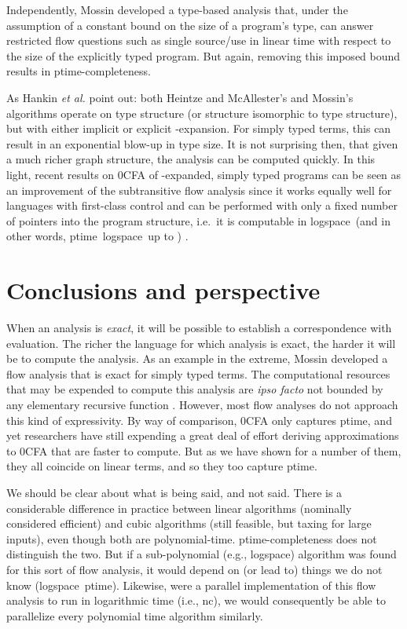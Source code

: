 \documentclass{llncs}
\newcommand\nc{{\sc nc}}
\newcommand\ptime{{\sc ptime}}
\newcommand\logspace{{\sc logspace}}
\begin{document}
Independently, Mossin \cite{mossin-98} developed a type-based analysis
that, under the assumption of a constant bound on the size of a
program's type, can answer restricted flow questions such as single
source/use in linear time with respect to the size of the explicitly
typed program.  But again, removing this imposed bound results in
\ptime-completeness.

As Hankin {\em et al.} \cite{hankin-games} point out: both Heintze
and McAllester's and Mossin's algorithms operate on type structure (or
structure isomorphic to type structure), but with either implicit or
explicit -expansion.  For simply typed terms, this can result in
an exponential blow-up in type size.  It is not surprising then, that
given a much richer graph structure, the analysis can be computed
quickly.  In this light, recent results on 0CFA of -expanded,
simply typed programs can be seen as an improvement of the
subtransitive flow analysis since it works equally well for languages
with first-class control and can be performed with only a fixed number
of pointers into the program structure, i.e.~it is computable in
\logspace\ (and in other words, \ptime\ 
\logspace\ up to ) \cite{vanhorn-mairson-07}.






\section{Conclusions and perspective}



When an analysis is {\em exact}, it will be possible to establish a
correspondence with evaluation.  The richer the language for which
analysis is exact, the harder it will be to compute the analysis.  As
an example in the extreme, Mossin \cite{mossin-97} developed a flow
analysis that is exact for simply typed terms.  The computational
resources that may be expended to compute this analysis are {\em ipso
facto} not bounded by any elementary recursive function
\cite{statman}.  However, most flow analyses do not approach this kind
of expressivity.  By way of comparison, 0CFA only captures \ptime, and
yet researchers have still expending a great deal of effort deriving
approximations to 0CFA that are faster to compute.  But as we have
shown for a number of them, they all coincide on linear terms, and so
they too capture \ptime.





We should be clear about what is being said, and not said.  There is a
considerable difference in practice between linear algorithms
(nominally considered efficient) and cubic algorithms (still feasible,
but taxing for large inputs), even though both are polynomial-time.
\ptime-completeness does not distinguish the two.  But if a
sub-polynomial (e.g., \logspace) algorithm was found for this sort of
flow analysis, it would depend on (or lead to) things we do not know
(\logspace\  \ptime).  Likewise, were a parallel implementation of
this flow analysis to run in logarithmic time (i.e., \nc), we would
consequently be able to parallelize every polynomial time algorithm
similarly.
\end{document}
